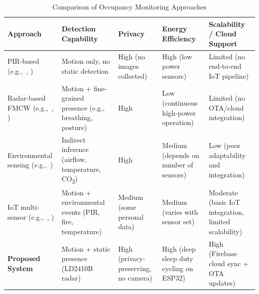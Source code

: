 \documentclass[conference]{IEEEtran}
\begin{document}
\begin{table}[htbp]
\centering
\caption{Comparison of Occupancy Monitoring Approaches}
\label{tab:related-comparison}
\begin{tabular}{|p{3cm}|p{3.2cm}|p{2.8cm}|p{3.2cm}|p{3.2cm}|}
\hline
\textbf{Approach} & \textbf{Detection Capability} & \textbf{Privacy} & \textbf{Energy Efficiency} & \textbf{Scalability / Cloud Support} \\ \hline

PIR-based 
(e.g.,~\cite{leech2017pir}, \cite{singh2018room}) 
& Motion only, no static detection 
& High (no images collected) 
& High (low power sensors) 
& Limited (no end-to-end IoT pipeline) \\ \hline

Radar-based FMCW 
(e.g.,~\cite{cui2021mmwave}, \cite{shen2024radar}) 
& Motion + fine-grained presence (e.g., breathing, posture) 
& High 
& Low (continuous high-power operation) 
& Limited (no OTA/cloud integration) \\ \hline

Environmental sensing 
(e.g.,~\cite{jin2018env}) 
& Indirect inference (airflow, temperature, CO\textsubscript{2}) 
& High 
& Medium (depends on number of sensors) 
& Low (poor adaptability and integration) \\ \hline

IoT multi-sensor 
(e.g.,~\cite{pathri2024hostel}, \cite{taryudi2018iot}) 
& Motion + environmental events (PIR, fire, temperature) 
& Medium (some personal data) 
& Medium (varies with sensor set) 
& Moderate (basic IoT integration, limited scalability) \\ \hline

\textbf{Proposed System} 
& Motion + static presence (LD2410B radar) 
& High (privacy-preserving, no camera) 
& High (deep sleep duty cycling on ESP32) 
& High (Firebase cloud sync + OTA updates) \\ \hline

\end{tabular}
\end{table}


\end{document}
